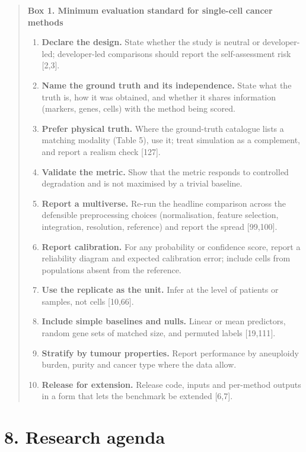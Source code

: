 \documentclass{article}
\begin{document}
\begin{quote}
\textbf{Box 1. Minimum evaluation standard for single-cell cancer methods}


\begin{enumerate}
\def\labelenumi{\arabic{enumi}.}
\tightlist
\item
  \textbf{Declare the design.} State whether the study is neutral or
  developer-led; developer-led comparisons should report the
  self-assessment risk {[}2,3{]}.
\item
  \textbf{Name the ground truth and its independence.} State what the
  truth is, how it was obtained, and whether it shares information
  (markers, genes, cells) with the method being scored.
\item
  \textbf{Prefer physical truth.} Where the ground-truth catalogue lists
  a matching modality (Table 5), use it; treat simulation as a
  complement, and report a realism check {[}127{]}.
\item
  \textbf{Validate the metric.} Show that the metric responds to
  controlled degradation and is not maximised by a trivial baseline.
\item
  \textbf{Report a multiverse.} Re-run the headline comparison across
  the defensible preprocessing choices (normalisation, feature
  selection, integration, resolution, reference) and report the spread
  {[}99,100{]}.
\item
  \textbf{Report calibration.} For any probability or confidence score,
  report a reliability diagram and expected calibration error; include
  cells from populations absent from the reference.
\item
  \textbf{Use the replicate as the unit.} Infer at the level of patients
  or samples, not cells {[}10,66{]}.
\item
  \textbf{Include simple baselines and nulls.} Linear or mean
  predictors, random gene sets of matched size, and permuted labels
  {[}19,111{]}.
\item
  \textbf{Stratify by tumour properties.} Report performance by
  aneuploidy burden, purity and cancer type where the data allow.
\item
  \textbf{Release for extension.} Release code, inputs and per-method
  outputs in a form that lets the benchmark be extended {[}6,7{]}.
\end{enumerate}
\end{quote}

\section{8. Research agenda}\label{research-agenda}
\end{document}
